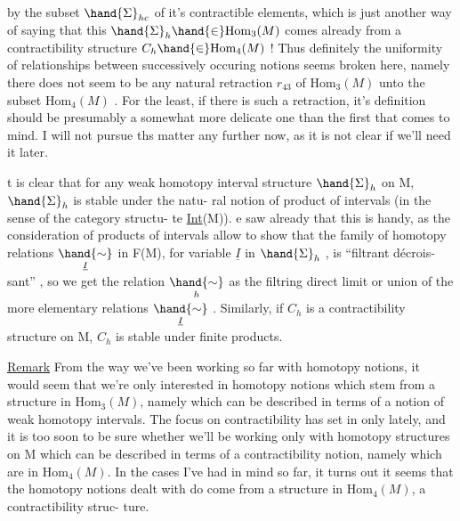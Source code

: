 
by the subset $\hand{\Sigma}_{hc}$ of it's contractible elements, which is just another
way of saying that this $\hand{\Sigma}_h \hand{\in} \mathrm{Hom}_3(M)$ comes already from a contractibility
structure $C_h \hand{\in} \mathrm{Hom}_4(M)$ ! Thus definitely the uniformity of  relationships
between successively occuring notions seems broken here, namely there
does not seem to be any natural retraction $r_{43}$ of $\mathrm{Hom}_3(M)$ unto the subset
$\mathrm{Hom}_4(M)$ . For the least, if there is such a retraction, it's definition
should be presumably a somewhat more delicate one than the first that 
comes to mind. I will not pursue ths matter any further now, as it is
not clear if we'll need it later.

 t is clear that  for any
weak homotopy interval structure $\hand{\Sigma}_h$ on M, $\hand{\Sigma}_h$ is stable under the natu-%
ral notion of  product of intervals (in the sense of the category structu-%
te  \uline{Int}(M)). e saw already that this is handy, as the consideration
of products of intervals allow to show that the family of homotopy
relations $\underset{\underline{I}}{\hand{\sim}}$ in F(M), for variable $\underline{I}$ in $\hand{\Sigma}_h$ , is ``filtrant décrois-%
sant'' , so we get the relation $\underset{h}{\hand{\sim}}$ as the filtring direct limit or
union of the more elementary relations $\underset{\underline{I}}{\hand{\sim}}$ . Similarly, if $C_h$  is a
contractibility structure on M, $C_h$ is stable under finite products.

\uline{Remark} From the way we've been working so far with homotopy notions, it
would seem that we're only interested  in homotopy notions which stem
from a structure in $\mathrm{Hom}_3(M)$, namely which can be described in terms of a
notion of weak homotopy intervals. The focus on contractibility has set
in only lately, and it is too soon to be sure whether we'll be working
only with homotopy structures on M which can be described in terms of a
contractibility notion, namely which are in $\mathrm{Hom}_4(M)$. In the cases I've
had in mind so far, it turns out  it seems that the homotopy notions
dealt with do come from a structure in $\mathrm{Hom}_4(M)$,  a contractibility struc-%
ture.

